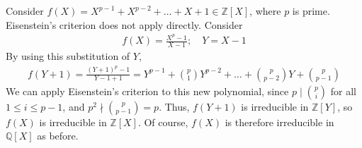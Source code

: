 \begin{example}
	Consider $f(X) = X^{p-1} + X^{p-2} + \dots + X + 1 \in \mathbb Z[X]$, where $p$ is prime.
	Eisenstein's criterion does not apply directly.
	Consider
	\begin{align*}
		f(X) = \frac{X^p - 1}{X - 1};\quad Y = X - 1
	\end{align*}
	By using this substitution of $Y$,
	\begin{align*}
		f(Y+1) = \frac{(Y+1)^p - 1}{Y-1 + 1} = Y^{p-1} + \binom{p}{1} Y^{p-2} + \dots + \binom{p}{p-2} Y + \binom{p}{p-1}
	\end{align*}
	We can apply Eisenstein's criterion to this new polynomial, since $p \mid \binom{p}{i}$ for all $1 \leq i \leq p - 1$, and $p^2 \nmid \binom{p}{p-1} = p$.
	Thus, $f(Y+1)$ is irreducible in $\mathbb Z[Y]$, so $f(X)$ is irreducible in $\mathbb Z[X]$.
	Of course, $f(X)$ is therefore irreducible in $\mathbb Q[X]$ as before.
\end{example}
